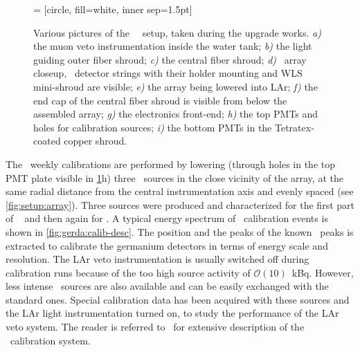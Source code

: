 \begin{figure}
   = [circle, fill=white, inner sep=1.5pt]
  \caption{%
    Various pictures of the \gerda\ \phasetwo\ setup, taken during the upgrade works.
    \emph{a)} the muon veto instrumentation inside the water tank; \emph{b)} the light
    guiding outer fiber shroud; \emph{c)} the central fiber shroud; \emph{d)} \phasetwo\
    array closeup, \bege\ detector strings with their holder mounting and WLS mini-shroud
    are visible; \emph{e)} the array being lowered into LAr; \emph{f)} the end cap of the
    central fiber shroud is visible from below the assembled array; \emph{g)} the
    electronics front-end; \emph{h)} the top PMTs and holes for calibration sources;
    \emph{i)} the bottom PMTs in the Tetratex\reg-coated copper shroud.
  }\label{fig:setup:pictures}
\end{figure}

The \gerda\ weekly calibrations are performed by lowering (through holes in the top PMT
plate visible in \cref{fig:setup:pictures}h) three \Th\ sources in the close vicinity of
the array, at the same radial distance from the central instrumentation axis and evenly
spaced (see \cref{fig:setup:array}). Three sources were produced and characterized for the
first part of \phasetwo~\cite{Baudis2015} and then again for \phasetwop. A typical energy
spectrum of \Th\ calibration events is shown in \cref{fig:gerda:calib-desc}. The position
and the peaks of the known \g\ peaks is extracted to calibrate the germanium detectors in
terms of energy scale and resolution. The LAr veto instrumentation is usually switched off
during calibration runs because of the too high source activity of $\mathcal{O}(10)$~kBq.
However, less intense \Ra\ sources are also available and can be easily exchanged with the
standard ones. Special calibration data has been acquired with these sources and the LAr
light instrumentation turned on, to study the performance of the LAr veto system. The
reader is referred to~\cite{Mingazheva2019, Miloradovic2020, Agostini2021c} for extensive
description of the \gerda\ calibration system.

